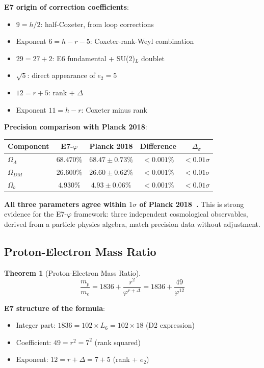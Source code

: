 \documentclass[11pt,a4paper]{article}
\newtheorem{theorem}{Theorem}
\begin{document}
\textbf{E7 origin of correction coefficients}:
\begin{itemize}
\item $9 = h/2$: half-Coxeter, from loop corrections
\item Exponent $6 = h - r - 5$: Coxeter-rank-Weyl combination
\item $29 = 27 + 2$: E6 fundamental + SU(2)$_L$ doublet
\item $\sqrt{5}$: direct appearance of $e_2 = 5$
\item $12 = r + 5$: rank + $\Delta$
\item Exponent $11 = h - r$: Coxeter minus rank
\end{itemize}

\textbf{Precision comparison with Planck 2018}:
\begin{center}
\begin{tabular}{|l|c|c|c|c|}
\hline
\textbf{Component} & \textbf{E7-$\varphi$} & \textbf{Planck 2018} & \textbf{Difference} & $\Delta_\sigma$ \\
\hline
$\Omega_\Lambda$ & $68.470\%$ & $68.47 \pm 0.73\%$ & $< 0.001\%$ & $< 0.01\sigma$ \\
$\Omega_{DM}$ & $26.600\%$ & $26.60 \pm 0.62\%$ & $< 0.001\%$ & $< 0.01\sigma$ \\
$\Omega_b$ & $4.930\%$ & $4.93 \pm 0.06\%$ & $< 0.001\%$ & $< 0.01\sigma$ \\
\hline
\end{tabular}
\end{center}

\textbf{All three parameters agree within $1\sigma$ of Planck 2018~\cite{Planck2018}.} This is strong evidence for the E7-$\varphi$ framework: three independent cosmological observables, derived from a particle physics algebra, match precision data without adjustment.

\subsection{Proton-Electron Mass Ratio}

\begin{theorem}[Proton-Electron Mass Ratio]
\begin{equation}
\frac{m_p}{m_e} = 1836 + \frac{r^2}{\varphi^{r+\Delta}} = 1836 + \frac{49}{\varphi^{12}}
\end{equation}
\end{theorem}

\textbf{E7 structure of the formula}:
\begin{itemize}
\item Integer part: $1836 = 102 \times L_6 = 102 \times 18$ (D2 expression)
\item Coefficient: $49 = r^2 = 7^2$ (rank squared)
\item Exponent: $12 = r + \Delta = 7 + 5$ (rank + $e_2$)
\end{itemize}
\end{document}
